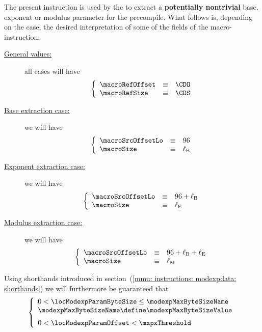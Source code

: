 The present instruction is used by the \hubMod{} to extract a \textbf{potentially nontrivial} base, exponent or modulus parameter for the \instModexp{} precompile.
What follows is, depending on the case, the desired interpretation of some of the fields of the macro-instruction:
\begin{description}
	\item[\underline{General values:}]
		all cases will have
		\[
			\left\{ \begin{array}{lcl}
				\macroRefOffset  & \equiv & \CDO \\
				\macroRefSize    & \equiv & \CDS \\
			\end{array} \right.
		\]
	\item[\underline{Base extraction case:}] 
		we will have
		\[
			\left\{ \begin{array}{lcl}
				\macroSrcOffsetLo  & \equiv & 96            \\
				\macroSize         & \equiv & \ell_\text{B} \\
			\end{array} \right.
		\]
	\item[\underline{Exponent extraction case:}] 
		we will have
		\[
			\left\{ \begin{array}{lcl}
				\macroSrcOffsetLo  & \equiv & 96 + \ell_\text{B} \\
				\macroSize         & \equiv & \ell_\text{E}      \\
			\end{array} \right.
		\]
	\item[\underline{Modulus extraction case:}] 
		we will have
		\[
			\left\{ \begin{array}{lcl}
				\macroSrcOffsetLo  & \equiv & 96 + \ell_\text{B} + \ell_\text{E} \\
				\macroSize         & \equiv & \ell_\text{M}                      \\
			\end{array} \right.
		\]
\end{description}
Using shorthands introduced in section~(\ref{mmu: instructions: modexpdata: shorthands}) we will furthermore be guaranteed that
\[
	\left\{ \begin{array}{l}
		0 < \locModexpParamByteSize \leq \modexpMaxByteSizeName             \\
		\modexpMaxByteSizeName \define \modexpMaxByteSizeValue \vspace{2mm} \\
		0 < \locModexpParamOffset   <    \mxpxThreshold                     \\
	\end{array} \right.
\]

